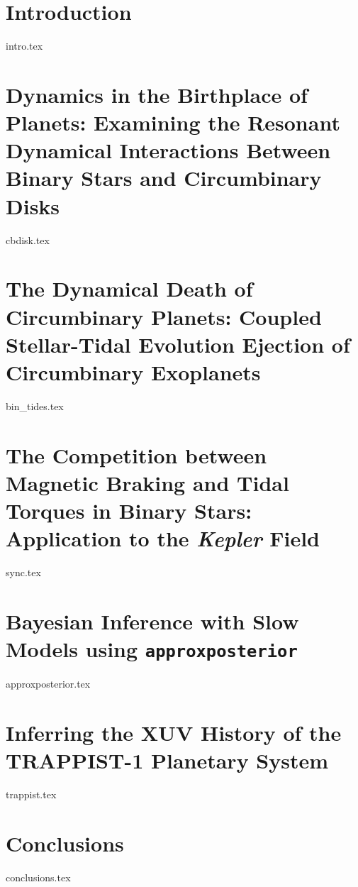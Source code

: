 \documentclass [11pt, proquest]{uwthesis} %
\newcommand{\approxposterior}[0]{\texttt{approxposterior}\xspace}
\newcommand{\kepler}[0]{\textit{Kepler}\xspace}
\begin{document}
%
%

\textpages
 

\chapter{Introduction}
{intro.tex}

\chapter{Dynamics in the Birthplace of Planets: Examining the Resonant Dynamical Interactions Between Binary Stars and Circumbinary Disks}
{cbdisk.tex}

\chapter{The Dynamical Death of Circumbinary Planets: Coupled Stellar-Tidal Evolution Ejection of Circumbinary Exoplanets}
{bin_tides.tex}

\chapter{The Competition between Magnetic Braking and Tidal Torques in Binary Stars: Application to the \kepler Field}
{sync.tex}

\chapter{Bayesian Inference with Slow Models using \approxposterior}
{approxposterior.tex}

\chapter{Inferring the XUV History of the TRAPPIST-1 Planetary System}
{trappist.tex}

\chapter{Conclusions}
{conclusions.tex}

\printendnotes

%
%

%
%

\appendix
\raggedbottom\sloppy
\end{document}
